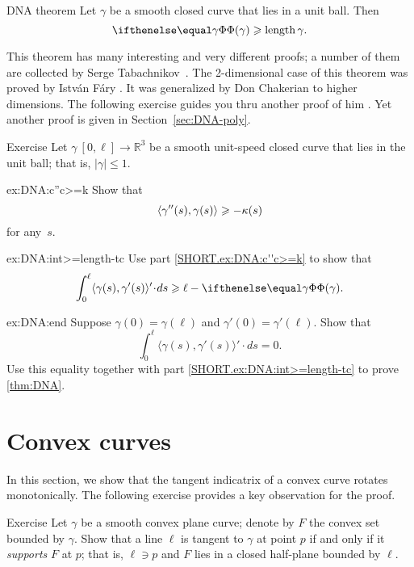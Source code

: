 \begin{thm}{DNA theorem}\label{thm:DNA}
Let $\gamma$ be a smooth closed curve that lies in a unit ball.
Then 
\[\tc\gamma\ge \length\gamma.\]

\end{thm}

This theorem has many interesting and very different proofs;
a number of them are collected by Serge Tabachnikov~\cite{tabachnikov}.
The 2-dimensional case of this theorem was proved by Istv\'{a}n F\'{a}ry \cite{fary1950}.
It was generalized by Don Chakerian \cite{chakerian1962} to higher dimensions.
The following exercise guides you thru another proof of him \cite{chakerian1964}.
Yet another proof is given in Section~\ref{sec:DNA-poly}.

\begin{thm}{Exercise}\label{ex:DNA}
Let $\gamma\:[0,\ell]\to\mathbb{R}^3$ be a smooth unit-speed closed curve that lies in the unit ball; that is, $|\gamma|\le 1$.

\begin{subthm}{ex:DNA:c''c>=k}
Show that 
\[\langle\gamma''(s),\gamma(s)\rangle\geqslant-\kappa(s)\]
for any~$s$.
\end{subthm}

\begin{subthm}{ex:DNA:int>=length-tc}
Use part \ref{SHORT.ex:DNA:c''c>=k} to show that 
\[\int_0^\ell\langle\gamma(s),\gamma'(s)\rangle'\cdot ds\ge
\ell-\tc\gamma.\]

\end{subthm}

\begin{subthm}{ex:DNA:end}
Suppose $\gamma(0)=\gamma(\ell)$ and $\gamma'(0)=\gamma'(\ell)$.
Show that 
\[\int_0^\ell\langle\gamma(s),\gamma'(s)\rangle'\cdot ds=0.\]
Use this equality together with  part \ref{SHORT.ex:DNA:int>=length-tc} to prove \ref{thm:DNA}.
\end{subthm}
\end{thm}

\section{Convex curves}

In this section, we show that the tangent indicatrix of a convex curve rotates monotonically. 
The following exercise provides a key observation for the proof.

\begin{thm}{Exercise}\label{ex:tangent-support}
Let $\gamma$ be a smooth convex plane curve;
denote by $F$ the convex set bounded by $\gamma$.
Show that a line $\ell$ is tangent to $\gamma$ at point $p$ if and only if it \emph{supports} $F$ at $p$;
that is, $\ell\ni p$ and $F$ lies in a closed half-plane bounded by $\ell$.
\end{thm}

